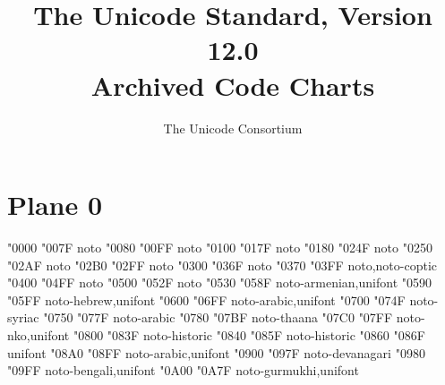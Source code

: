 \documentclass{article}
\title{The Unicode Standard, Version 12.0\\
  Archived Code Charts}
\author{The Unicode Consortium}
\begin{document}
\maketitle
\tableofcontents

\section{Plane 0}

                    {  "0000} {  "007F} {noto}
             {  "0080} {  "00FF} {noto}
                               {  "0100} {  "017F} {noto}
                               {  "0180} {  "024F} {noto}
                                 {  "0250} {  "02AF} {noto}
                       {  "02B0} {  "02FF} {noto}
                    {  "0300} {  "036F} {noto}
                               {  "0370} {  "03FF} {noto,noto-coptic}
                                       {  "0400} {  "04FF} {noto}
                            {  "0500} {  "052F} {noto}
                                       {  "0530} {  "058F} {noto-armenian,unifont}
                                         {  "0590} {  "05FF} {noto-hebrew,unifont}
                                         {  "0600} {  "06FF} {noto-arabic,unifont}
                                         {  "0700} {  "074F} {noto-syriac}
                              {  "0750} {  "077F} {noto-arabic}
                                         {  "0780} {  "07BF} {noto-thaana}
                                            {  "07C0} {  "07FF} {noto-nko,unifont}
                                      {  "0800} {  "083F} {noto-historic}
                                        {  "0840} {  "085F} {noto-historic}
                              {  "0860} {  "086F} {unifont}
                              {  "08A0} {  "08FF} {noto-arabic,unifont}
                                     {  "0900} {  "097F} {noto-devanagari}
                                        {  "0980} {  "09FF} {noto-bengali,unifont}
                                       {  "0A00} {  "0A7F} {noto-gurmukhi,unifont}
\end{document}
